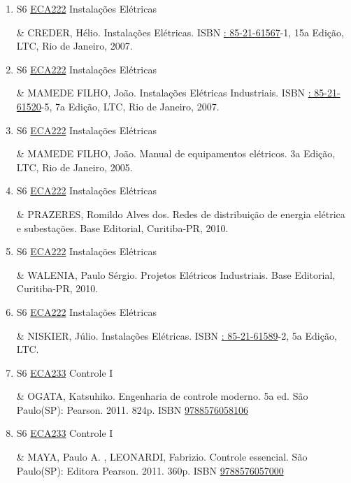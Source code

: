 \documentclass[12pt,a4paper]{book}
\begin{document}
\begin{enumerate}
 \item S6 \hyperref[PUD:ECA222]{ECA222} Instalações Elétricas

& CREDER, Hélio.  Instalações Elétricas.  ISBN \href{http://www.google.com/search?hl=pt-BR&tbo=p&tbm=bks&q=isbn:: 85-21-61567&num=10}{: 85-21-61567}-1, 15a Edição, LTC, Rio de Janeiro, 2007. 
 

 \item S6 \hyperref[PUD:ECA222]{ECA222} Instalações Elétricas

& MAMEDE FILHO, João.  Instalações Elétricas Industriais.  ISBN \href{http://www.google.com/search?hl=pt-BR&tbo=p&tbm=bks&q=isbn:: 85-21-61520&num=10}{: 85-21-61520}-5, 7a Edição, LTC, Rio de Janeiro, 2007.
 \item S6 \hyperref[PUD:ECA222]{ECA222} Instalações Elétricas

& MAMEDE FILHO, João.  Manual de equipamentos elétricos.  3a Edição, LTC, Rio de Janeiro, 2005. 
 

 \item S6 \hyperref[PUD:ECA222]{ECA222} Instalações Elétricas

& PRAZERES, Romildo Alves dos.  Redes de distribuição de energia elétrica e subestações.  Base Editorial, Curitiba-PR, 2010. 
 

 \item S6 \hyperref[PUD:ECA222]{ECA222} Instalações Elétricas

& WALENIA, Paulo Sérgio.  Projetos Elétricos Industriais.  Base Editorial, Curitiba-PR, 2010. 
 

 \item S6 \hyperref[PUD:ECA222]{ECA222} Instalações Elétricas

&  NISKIER, Júlio.  Instalações Elétricas.  ISBN \href{http://www.google.com/search?hl=pt-BR&tbo=p&tbm=bks&q=isbn:: 85-21-61589&num=10}{: 85-21-61589}-2, 5a Edição, LTC.
 \item S6 \hyperref[PUD:ECA233]{ECA233} Controle I

& OGATA, Katsuhiko.  Engenharia de controle moderno.  5a ed.  São Paulo(SP): Pearson.  2011.  824p.  ISBN \href{http://www.bn.br/site/pages/servicosProfissionais/agenciaISBN/isbnBusca/FbnBuscaISBNCatalogo.asp?pField=ISBN&pIntPagina=1&pISBN=76058106&nidbISBN=true&hidbISBN=true}{9788576058106} 
 

 \item S6 \hyperref[PUD:ECA233]{ECA233} Controle I

&  MAYA, Paulo A. , LEONARDI, Fabrizio.  Controle essencial.  São Paulo(SP): Editora Pearson.  2011.  360p.  ISBN \href{http://www.bn.br/site/pages/servicosProfissionais/agenciaISBN/isbnBusca/FbnBuscaISBNCatalogo.asp?pField=ISBN&pIntPagina=1&pISBN=76057000&nidbISBN=true&hidbISBN=true}{9788576057000}
 


\end{enumerate}
\end{document}
